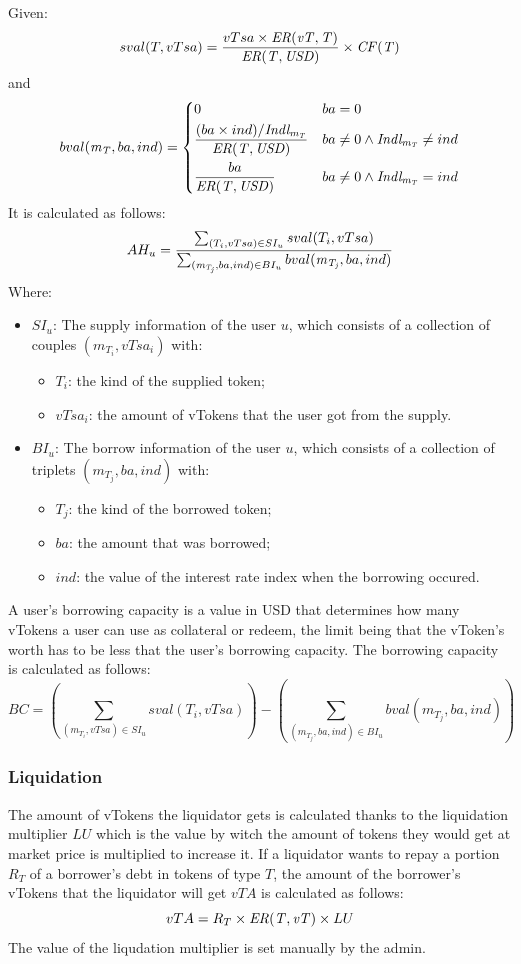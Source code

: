 \noindent Given: 
$$
  sval(T, vTsa) = \frac{vTsa \times \mathit{ER(vT, T)}}{\mathit{ER(T, \mathit{USD})}} \times \mathit{CF(T)}
$$
and
$$
  bval(\mathit{m_{T}}, ba, ind) =\begin{dcases}
    0 & ba = 0\\
    \frac{(ba \times ind)/ \mathit{Indl_{\mathit{m_{T}}}}}{\mathit{ER(T, \mathit{USD})}} & ba \neq 0 \wedge \mathit{Indl_{\mathit{m_{T}}}} \neq ind \\
    \frac{ba}{\mathit{ER(T, \mathit{USD})}} & ba \neq 0 \wedge \mathit{Indl_{\mathit{m_{T}}}} = ind
    \end{dcases}
$$
It is calculated as follows:
$$
  AH_u = 
    \frac { 
      \sum_{(T_i, vTsa) \in SI_u} 
        sval(T_i, vTsa)
    } { 
      \sum_{(\mathit{m_{T_j}}, ba, ind) \in BI_u} 
      bval(\mathit{m_{T_j}}, ba, ind)
    }
$$
Where: 
\begin{itemize}
  \item $SI_u$: The supply information of the user $u$, which consists of a collection of couples $(m_{T_i}, vTsa_i)$ with: 
  \begin{itemize}
    \item $T_i$: the kind of the supplied token;
    \item $vTsa_i$: the amount of vTokens that the user got from the supply. 
  \end{itemize}
  \item $BI_u$: The borrow information of the user $u$, which consists of a collection of triplets $(m_{T_j}, ba, ind)$ with: 
  \begin{itemize}
    \item $T_j$: the kind of the borrowed token;
    \item $ba$: the amount that was borrowed;
    \item $ind$: the value of the interest rate index when the borrowing occured. 
  \end{itemize}
\end{itemize}

A user's borrowing capacity is a value in USD that determines how many vTokens a user can use as collateral or redeem, the limit being that the vToken's worth has to be less that the user's borrowing capacity. The borrowing capacity is calculated as follows: 
$$
  BC = (\sum_{(m_{T_i}, vTsa) \in SI_u} sval(T_i, vTsa)) - (\sum_{(m_{T_j}, ba, ind) \in BI_u} bval(m_{T_j}, ba, ind))
$$

\subsubsection{Liquidation}

The amount of vTokens the liquidator gets is calculated thanks to the liquidation multiplier $LU$ which is the value by witch the amount of tokens they would get at market price is multiplied to increase it. If a liquidator wants to repay a portion $R_T$ of a borrower's debt in tokens of type $T$, the amount of the borrower's vTokens that the liquidator will get $vTA$ is calculated as follows:
$$
  vTA = R_T \times \mathit{ER(T, vT)} \times LU
$$
The value of the liqudation multiplier is set manually by the admin.

